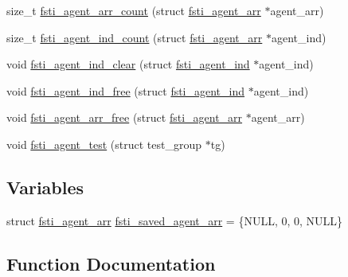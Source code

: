 \begin{DoxyCompactItemize}
\item 
size\+\_\+t \mbox{\hyperlink{fsti-agent_8c_a6ec54eca95530e863760046101ac02e1}{fsti\+\_\+agent\+\_\+arr\+\_\+count}} (struct \mbox{\hyperlink{structfsti__agent__arr}{fsti\+\_\+agent\+\_\+arr}} $\ast$agent\+\_\+arr)
\item 
size\+\_\+t \mbox{\hyperlink{fsti-agent_8c_ab6a4276af0e80540add3d0a612b91071}{fsti\+\_\+agent\+\_\+ind\+\_\+count}} (struct \mbox{\hyperlink{structfsti__agent__arr}{fsti\+\_\+agent\+\_\+arr}} $\ast$agent\+\_\+ind)
\item 
void \mbox{\hyperlink{fsti-agent_8c_a6ea0014798a460e51b30b2d8af0dda25}{fsti\+\_\+agent\+\_\+ind\+\_\+clear}} (struct \mbox{\hyperlink{structfsti__agent__ind}{fsti\+\_\+agent\+\_\+ind}} $\ast$agent\+\_\+ind)
\item 
void \mbox{\hyperlink{fsti-agent_8c_ab9adb18f274475832c5a763be7d001d7}{fsti\+\_\+agent\+\_\+ind\+\_\+free}} (struct \mbox{\hyperlink{structfsti__agent__ind}{fsti\+\_\+agent\+\_\+ind}} $\ast$agent\+\_\+ind)
\item 
void \mbox{\hyperlink{fsti-agent_8c_a0c1f310e7cd98b4122a4348b0ec26b4f}{fsti\+\_\+agent\+\_\+arr\+\_\+free}} (struct \mbox{\hyperlink{structfsti__agent__arr}{fsti\+\_\+agent\+\_\+arr}} $\ast$agent\+\_\+arr)
\item 
void \mbox{\hyperlink{fsti-agent_8c_aa9fa3865ab9658915f20e4212ca4cbe4}{fsti\+\_\+agent\+\_\+test}} (struct test\+\_\+group $\ast$tg)
\end{DoxyCompactItemize}
\subsection*{Variables}
\begin{DoxyCompactItemize}
\item 
struct \mbox{\hyperlink{structfsti__agent__arr}{fsti\+\_\+agent\+\_\+arr}} \mbox{\hyperlink{fsti-agent_8c_a0d0890f5771bd3efa056881d37f4c6b9}{fsti\+\_\+saved\+\_\+agent\+\_\+arr}} = \{N\+U\+LL, 0, 0, N\+U\+LL\}
\end{DoxyCompactItemize}


\subsection{Function Documentation}
\mbox{\label{fsti-agent_8c_a63a22afc13737a55174adb97f2cbcfc1}} 
